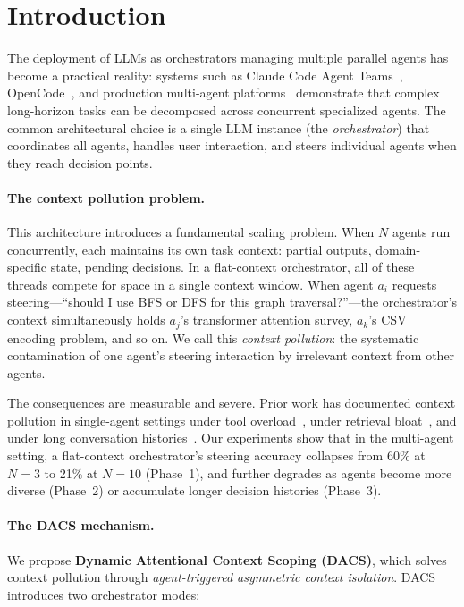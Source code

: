 \documentclass{article}
\begin{document}
\section{Introduction}
\label{sec:intro}

The deployment of LLMs as orchestrators managing multiple parallel agents
has become a practical reality: systems such as Claude Code Agent
Teams~\citep{anthropic2025code}, OpenCode~\citep{opencode2025}, and
production multi-agent platforms~\citep{agentorchestra2025} demonstrate
that complex long-horizon tasks can be decomposed across concurrent
specialized agents.
The common architectural choice is a single LLM instance (the
\emph{orchestrator}) that coordinates all agents, handles user
interaction, and steers individual agents when they reach decision points.

\paragraph{The context pollution problem.}
This architecture introduces a fundamental scaling problem.
When $N$ agents run concurrently, each maintains its own task context:
partial outputs, domain-specific state, pending decisions.
In a flat-context orchestrator, all of these threads compete for space in
a single context window.
When agent $a_i$ requests steering—``should I use BFS or DFS for this
graph traversal?''—the orchestrator's context simultaneously holds $a_j$'s
transformer attention survey, $a_k$'s CSV encoding problem, and so on.
We call this \emph{context pollution}: the systematic contamination of
one agent's steering interaction by irrelevant context from other agents.

The consequences are measurable and severe.
Prior work has documented context pollution in single-agent settings
under tool overload~\citep{adaptorch2025,codedelegator2025}, under
retrieval bloat~\citep{sidequest2025}, and under long conversation
histories~\citep{afm2024,ace2026}.
Our experiments show that in the multi-agent setting, a flat-context
orchestrator's steering accuracy collapses from 60\% at $N=3$ to 21\% at
$N=10$ (Phase~1), and further degrades as agents become more diverse
(Phase~2) or accumulate longer decision histories (Phase~3).

\paragraph{The DACS mechanism.}
We propose \textbf{Dynamic Attentional Context Scoping (DACS)}, which
solves context pollution through \emph{agent-triggered asymmetric context
isolation}.
DACS introduces two orchestrator modes:
\end{document}
